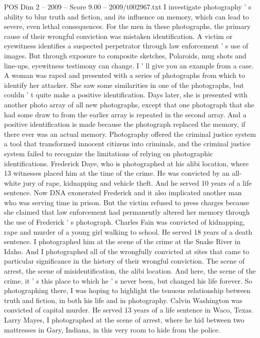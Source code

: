 \begin{textsample}{POS Dim 2 – 2009 – Score 9.00 – 2009/t002967.txt}
I investigate photography ' s ability to blur truth and fiction, and its influence on memory, which can lead to severe, even lethal consequences.
For the men in these photographs, the primary cause of their wrongful conviction was mistaken identification.
A victim or eyewitness identifies a suspected perpetrator through law enforcement ' s use of images.
But through exposure to composite sketches, Polaroids, mug shots and line-ups, eyewitness testimony can change.
I ' ll give you an example from a case.
A woman was raped and presented with a series of photographs from which to identify her attacker.
She saw some similarities in one of the photographs, but couldn ' t quite make a positive identification.
Days later, she is presented with another photo array of all new photographs, except that one photograph that she had some draw to from the earlier array is repeated in the second array.
And a positive identification is made because the photograph replaced the memory, if there ever was an actual memory.
Photography offered the criminal justice system a tool that transformed innocent citizens into criminals, and the criminal justice system failed to recognize the limitations of relying on photographic identifications.
Frederick Daye, who is photographed at his alibi location, where 13 witnesses placed him at the time of the crime.
He was convicted by an all-white jury of rape, kidnapping and vehicle theft.
And he served 10 years of a life sentence.
Now DNA exonerated Frederick and it also implicated another man who was serving time in prison.
But the victim refused to press charges because she claimed that law enforcement had permanently altered her memory through the use of Frederick ' s photograph.
Charles Fain was convicted of kidnapping, rape and murder of a young girl walking to school.
He served 18 years of a death sentence.
I photographed him at the scene of the crime at the Snake River in Idaho.
And I photographed all of the wrongfully convicted at sites that came to particular significance in the history of their wrongful conviction.
The scene of arrest, the scene of misidentification, the alibi location.
And here, the scene of the crime, it ' s this place to which he ' s never been, but changed his life forever.
So photographing there, I was hoping to highlight the tenuous relationship between truth and fiction, in both his life and in photography.
Calvin Washington was convicted of capital murder.
He served 13 years of a life sentence in Waco, Texas.
Larry Mayes, I photographed at the scene of arrest, where he hid between two mattresses in Gary, Indiana, in this very room to hide from the police.

\end{textsample}
